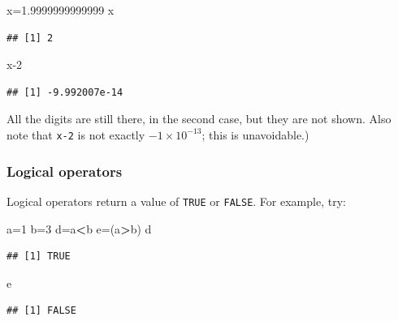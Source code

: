 \documentclass[11pt,]{article}
\newenvironment{Shaded}{\begin{snugshade}}{\end{snugshade}}
\newcommand{\DecValTok}[1]{\textcolor[rgb]{0.00,0.00,0.81}{#1}}
\newcommand{\FloatTok}[1]{\textcolor[rgb]{0.00,0.00,0.81}{#1}}
\newcommand{\NormalTok}[1]{#1}
\newcommand{\OperatorTok}[1]{\textcolor[rgb]{0.81,0.36,0.00}{\textbf{#1}}}
\begin{document}
\begin{Shaded}
\begin{Highlighting}[]
\NormalTok{x=}\FloatTok{1.9999999999999}
\NormalTok{x}
\end{Highlighting}
\end{Shaded}

\begin{verbatim}
## [1] 2
\end{verbatim}

\begin{Shaded}
\begin{Highlighting}[]
\NormalTok{x}\DecValTok{-2}
\end{Highlighting}
\end{Shaded}

\begin{verbatim}
## [1] -9.992007e-14
\end{verbatim}

All the digits are still there, in the second case, but they are not shown.
Also note that \texttt{x-2} is not exactly \(-1 \times 10^{-13}\); this is unavoidable.)

\hypertarget{logical-operators}{%
\subsubsection{Logical operators}\label{logical-operators}}

Logical operators return a value of \texttt{TRUE} or \texttt{FALSE}. For example,
try:

\begin{Shaded}
\begin{Highlighting}[]
\NormalTok{a=}\DecValTok{1}
\NormalTok{b=}\DecValTok{3}
\NormalTok{d=a}\OperatorTok{<}\NormalTok{b}
\NormalTok{e=(a}\OperatorTok{>}\NormalTok{b)}
\NormalTok{d}
\end{Highlighting}
\end{Shaded}

\begin{verbatim}
## [1] TRUE
\end{verbatim}

\begin{Shaded}
\begin{Highlighting}[]
\NormalTok{e}
\end{Highlighting}
\end{Shaded}

\begin{verbatim}
## [1] FALSE
\end{verbatim}
\end{document}
